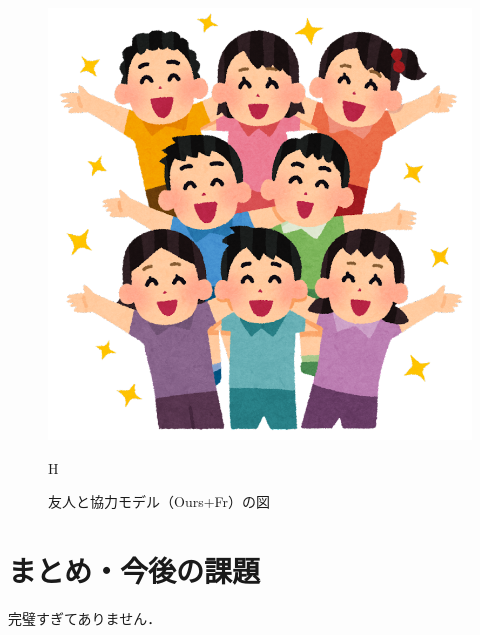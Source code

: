 \documentclass[twocolumn,8pt]{jsarticle}
\begin{document}
\begin{figure}[H]
    \centering
    \vspace{0.3cm}
    \includegraphics[clip, width=0.8\linewidth]{fig/kids_katawokumu.png}
    \caption{友人と協力モデル（Ours+Fr）の図}
    \label{fig:ours_fr}H
    \vspace{-0.5cm}
\end{figure}

\section{まとめ・今後の課題}
完璧すぎてありません．

\renewcommand{\refname}{参考文献}

%


\end{document}
